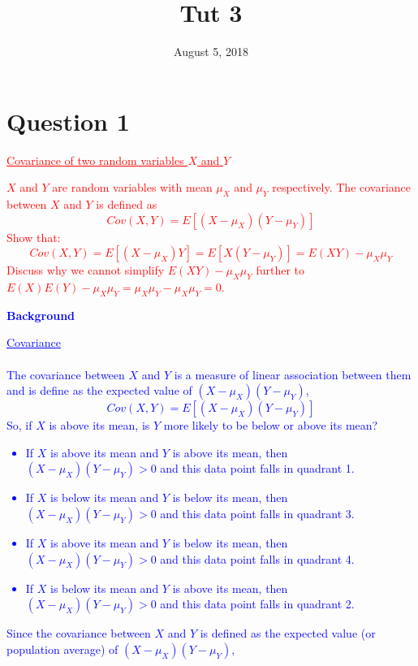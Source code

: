 \documentclass[12pt]{report}
\title{Tut 3}
\subtitle
{
	\textbf{keywords}: covariance, expected value, diversification, variance, risk, vector, matrix
	
	\textbf{estimated reading time}: 30 minutes
}
\date{August 5, 2018}
\newenvironment{blueframed}[1][blue]
{\def\FrameCommand{\fboxsep=\FrameSep\fcolorbox{#1}{white}}%
\MakeFramed {\advance\hsize-\width \FrameRestore}}
{\endMakeFramed}
\begin{document}
	
\maketitle

\section*{Question 1}
\textcolor{red}{\underline{Covariance of two random variables $X$ and $Y$}}

\noindent \textcolor{red}{$X$ and $Y$ are random variables with mean $\mu_X$ and $\mu_Y$ respectively. The covariance between $X$ and $Y$ is defined as $$Cov(X,Y) = E[(X-\mu_X)(Y-\mu_Y)]$$ Show that: $$Cov(X,Y) = E[(X-\mu_X)Y] = E[X(Y-\mu_Y)] = E(XY) - \mu_X \mu_Y$$ Discuss why we cannot simplify $E(XY) - \mu_X \mu_Y$ further to $E(X)E(Y) - \mu_X \mu_Y = \mu_X \mu_Y - \mu_X \mu_Y = 0$.}

\justify
\begin{blueframed}
	\textcolor{blue}{\textbf{Background}}
	\vspace{-\baselineskip}
	\justify
	\textcolor{blue}{\underline{Covariance} \\ \\ The covariance between $X$ and $Y$ is a measure of linear association between them and is define as the expected value of $(X-\mu_X)(Y-\mu_Y)$, $$Cov(X,Y) = E[(X-\mu_X)(Y-\mu_Y)]$$ So, if $X$ is above its mean, is $Y$ more likely to be below or above its mean? \begin{itemize}
			\item If $X$ is above its mean and $Y$ is above its mean, then $(X-\mu_X)(Y-\mu_Y) > 0$ and this data point falls in quadrant 1.
			\item If $X$ is below its mean and $Y$ is below its mean, then $(X-\mu_X)(Y-\mu_Y) > 0$ and this data point falls in quadrant 3.
			\item If $X$ is above its mean and $Y$ is below its mean, then $(X-\mu_X)(Y-\mu_Y) > 0$ and this data point falls in quadrant 4.
			\item If $X$ is below its mean and $Y$ is above its mean, then $(X-\mu_X)(Y-\mu_Y) > 0$ and this data point falls in quadrant 2.
		\end{itemize} Since the covariance between $X$ and $Y$ is defined as the expected value (or population average) of $(X-\mu_X)(Y-\mu_Y)$,}
\end{blueframed}
\end{document}
